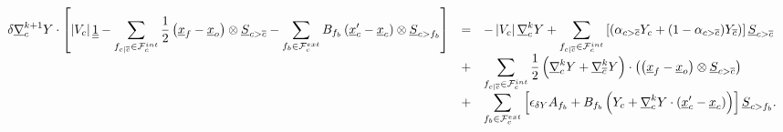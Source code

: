 \begin{equation}\label{eq:gradrc_recontruit_increment}
\begin{array}{r c l}
\displaystyle
\delta \underline{\nabla}_{c}^{k+1} Y \cdot \left[\left| V_{c} \right| \underline{\underline{1}} -
\sum\limits_{ {{f}_{c|{\overline{c}}}} \in \mathcal{F}^{int}_{c}} \frac{1}{2}  \left(\underline{x}_{{f}} - \underline{x}_o\right) \otimes \underline{S}_{{c > {\overline{c}}}} -
\sum\limits_{ {{f}_{b}} \in \mathcal{F}^{ext}_{c}} B_{{{f}_{b}}}  \left(\underline{x}_{c}^\prime - {\underline{x}_{c}}\right)  \otimes \underline{S}_{{c>{{f}_{b}}}}  \right]
&=&
\displaystyle
 -\left| V_{c} \right|  \underline{\nabla}_{c}^{k} Y +
\sum\limits_{{{f}_{c|{\overline{c}}}} \in \mathcal{F}^{int}_{c}}\left[
(\alpha_{{c > {\overline{c}}}} Y_{c} + (1 - \alpha_{{c > {\overline{c}}}}) Y_{{\overline{c}}})\right] \underline{S}_{{c > {\overline{c}}}} \\
&+&
\displaystyle
\sum\limits_{{{f}_{c|{\overline{c}}}} \in \mathcal{F}^{int}_{c}} \frac{1}{2}
\left(\underline{\nabla}_{c}^k Y + \underline{\nabla}_{{\overline{c}}}^k Y \right) \cdot \left( \left(\underline{x}_{{f}} - \underline{x}_o\right) \otimes \underline{S}_{{c > {\overline{c}}}} \right) \\
&+&
\displaystyle
\sum\limits_{{{f}_{b}} \in \mathcal{F}^{ext}_{c}}\left[ \epsilon_{\delta Y} A_{{{f}_{b}}}
            + B_{{{f}_{b}}} \left( Y_{c} + \underline{\nabla}_{c}^k Y \cdot \left(\underline{x}_{c}^\prime - {\underline{x}_{c}}\right) \right) \right] \underline{S}_{{c>{{f}_{b}}}}.
\end{array}
\end{equation}

